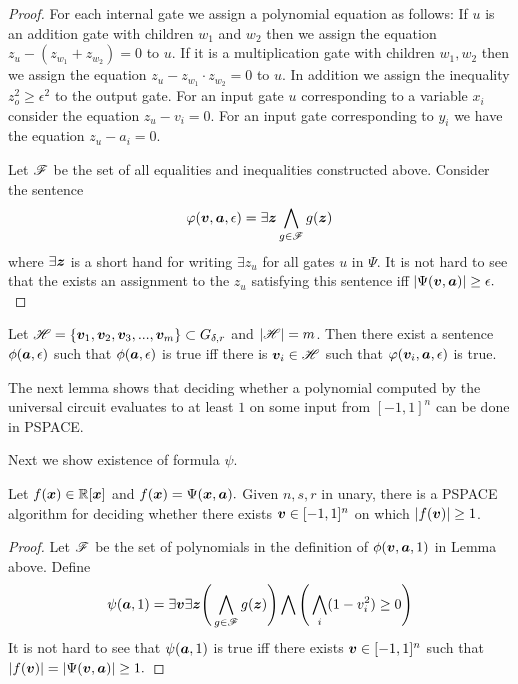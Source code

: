 {\begin{proof}
For each internal gate we assign a polynomial equation as follows: If $u$ is an addition gate with children $w_1$ and $w_2$ then we assign the equation $z_u-(z_{w_1}+z_{w_2})=0$ to $u$. If it is a multiplication gate with children $w_1,w_2$ then we assign the equation $z_u-z_{w_1}\cdot z_{w_2}=0$ to $u$. In addition we assign the inequality $z_o^2 \ge \epsilon^2$ to the output gate. For an input gate $u$ corresponding to a variable $x_i$ consider the equation $z_u-v_i=0.$ For an input gate corresponding to $y_i$ we have the equation
$z_u-a_i=0.$ 

Let $\mathscr{F}$ be the set of all equalities and inequalities constructed above. Consider the sentence 
$$
\varphi(\bm v,\bm a,\epsilon)=\exists \bm z \bigwedge_{g\in\mathscr{F}}g(\bm z)
$$
where $\exists \bm z$ is a short hand for writing $\exists z_u$ for all gates $u$ in $\Psi$. It is not hard to see that the exists an
assignment to the $z_u$ satisfying this sentence iff $|\Psi(\bm v,\bm a)|\ge\epsilon.$
\end{proof}
\begin{corollary}
Let $\mathscr{H}=\{\bm v_1,\bm v_2,\bm v_3,...,\bm v_m\}\subset G_{\delta,r}$ and $|\mathscr{H}|=m$. Then there exist a sentence $\phi(\bm a, \epsilon)$ such that $\phi(\bm a,\epsilon)$ is true iff there is $\bm v_i\in\mathscr{H}$ such that $\varphi(\bm v_i,\bm a,\epsilon)$ is true.
\end{corollary}
The next lemma shows that deciding whether a polynomial computed by the universal circuit evaluates to at least $1$ on some input from $[-1,1]^n$ can be done in PSPACE.

Next we show existence of formula $\psi$.

\begin{lemma}
Let $f(\bm x)\in\mathbb{R}[\bm x]$ and $f(\bm x)=\Psi(\bm x,\bm a).$ Given $n,s,r$ in unary, there is a PSPACE algorithm for deciding whether there exists $\bm v\in[-1,1]^n$ on which $|f(\bm v)|\ge 1$.
\begin{proof}
Let $\mathscr{F}$ be the set of polynomials in the definition of $\phi(\bm v,\bm a, 1)$ in Lemma above. Define
$$
\psi(\bm a,1)=\exists \bm v\exists \bm z\Bigg(\bigwedge_{g\in\mathscr{F}}g(\bm z)\Bigg)\bigwedge\Bigg(\bigwedge_i(1-v_i^2)\ge 0\Bigg)
$$
It is not hard to see that $\psi(\bm a,1)$ is true iff there exists $\bm v\in[-1,1]^n$ such that $|f(\bm v)|=|\Psi(\bm v,\bm a)|\ge 1.$
\end{proof}
\end{lemma}
}